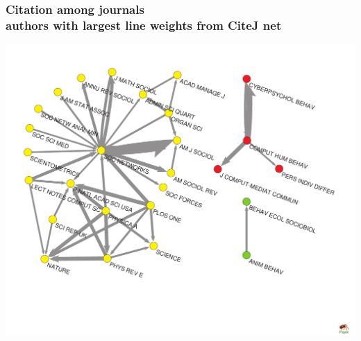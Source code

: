 \documentclass[hyperref={pdfstartview={FitBH -32768},
                         pdfpagemode=FullScreen,
                         plainpages=false,
                         colorlinks=true}
              ]{beamer}
\begin{document}
\begin{frame}[fragile]
\frametitle{Citation among journals\\ \normalsize authors with largest line weights from CiteJ net}

\begin{center}
\includegraphics[width=\textwidth]{JCiJ_27.pdf}
\end{center}

\end{frame}
\end{document}

